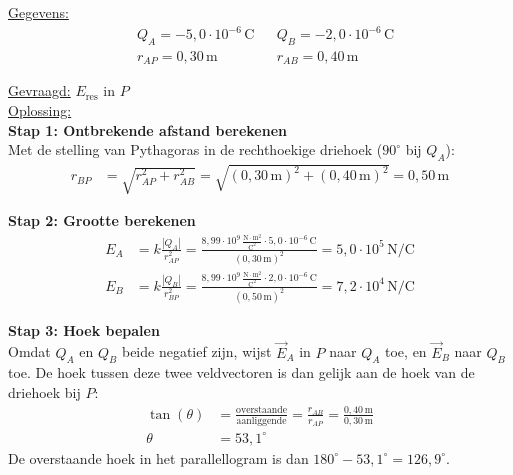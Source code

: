 \documentclass{ximera}
\begin{document}
\begin{exercise}
    \begin{solution}\nl
        \underline{Gegevens:}
        \begin{align*}
            & Q_{A} = -5{,}0 \cdot 10^{-6} \, \mathrm{C} & & Q_{B} = -2{,}0 \cdot 10^{-6} \, \mathrm{C} \\
            & r_{AP} = 0{,}30 \, \mathrm{m} & & r_{AB} = 0{,}40 \, \mathrm{m}
        \end{align*}

        \underline{Gevraagd:} $E_{\text{res}}$ in $P$\\

        \underline{Oplossing:}\\
        \textbf{Stap 1: Ontbrekende afstand berekenen}\\
        Met de stelling van Pythagoras in de rechthoekige driehoek ($90^\circ$ bij $Q_A$):
        \begin{align*}
            r_{BP} &= \sqrt{r_{AP}^{2} + r_{AB}^{2}} = \sqrt{(0{,}30 \, \mathrm{m})^{2} + (0{,}40 \, \mathrm{m})^{2}} = 0{,}50 \, \mathrm{m}
        \end{align*}

        \textbf{Stap 2: Grootte berekenen}
        \begin{align*}
            E_{A} &= k \frac{|Q_{A}|}{r_{AP}^{2}} = \frac{8{,}99 \cdot 10^{9} \, \mathrm{\frac{N \cdot m^2}{C^2}} \cdot 5{,}0 \cdot 10^{-6} \, \mathrm{C}}{(0{,}30 \, \mathrm{m})^{2}} = 5{,}0 \cdot 10^{5} \, \mathrm{N/C} \\
            E_{B} &= k \frac{|Q_{B}|}{r_{BP}^{2}} = \frac{8{,}99 \cdot 10^{9} \, \mathrm{\frac{N \cdot m^2}{C^2}} \cdot 2{,}0 \cdot 10^{-6} \, \mathrm{C}}{(0{,}50 \, \mathrm{m})^{2}} = 7{,}2 \cdot 10^{4} \, \mathrm{N/C}
        \end{align*}

        \textbf{Stap 3: Hoek bepalen}\\
        Omdat $Q_A$ en $Q_B$ beide negatief zijn, wijst $\vec{E}_A$ in $P$ naar $Q_A$ toe, en $\vec{E}_B$ naar $Q_B$ toe. De hoek tussen deze twee veldvectoren is dan gelijk aan de hoek van de driehoek bij $P$:
        \begin{align*}
            \tan(\theta) &= \frac{\text{overstaande}}{\text{aanliggende}} = \frac{r_{AB}}{r_{AP}} = \frac{0{,}40 \, \mathrm{m}}{0{,}30 \, \mathrm{m}} \\
            \theta &= 53{,}1^\circ
        \end{align*}
        De overstaande hoek in het parallellogram is dan $180^\circ - 53{,}1^\circ = 126{,}9^\circ$.


\end{solution}
\end{exercise}
\end{document}
